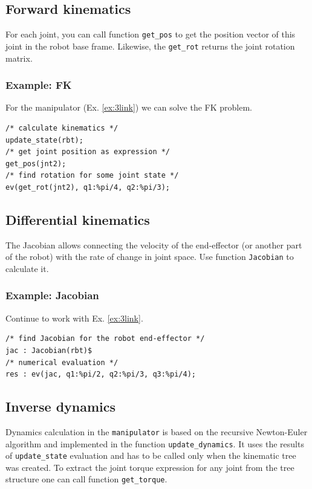 \documentclass{article}
\begin{document}
\subsection{Forward kinematics}

For each joint, you can call function \texttt{get\_pos} to get the position vector of this joint in the robot base frame. Likewise, the \texttt{get\_rot} returns the joint rotation matrix. 

\subsubsection{Example: FK}

For the manipulator (Ex. \ref{ex:3link}) we can solve the FK problem. 

\begin{verbatim}
/* calculate kinematics */
update_state(rbt); 
/* get joint position as expression */
get_pos(jnt2); 
/* find rotation for some joint state */
ev(get_rot(jnt2), q1:%pi/4, q2:%pi/3);
\end{verbatim}

\subsection{Differential kinematics}

The Jacobian allows connecting the velocity of the end-effector (or another part of the robot) with the rate of change in joint space. Use function \texttt{Jacobian} to calculate it.  

\subsubsection{Example: Jacobian} 

Continue to work with Ex. \ref{ex:3link}.
\begin{verbatim}
/* find Jacobian for the robot end-effector */
jac : Jacobian(rbt)$
/* numerical evaluation */
res : ev(jac, q1:%pi/2, q2:%pi/3, q3:%pi/4);
\end{verbatim}

\subsection{Inverse dynamics}
\label{sec:dyn}

Dynamics calculation in the \texttt{manipulator} is based on the recursive Newton-Euler algorithm and implemented in the function \texttt{update\_dynamics}. It uses the results of \texttt{update\_state} evaluation and has to be called only when the kinematic tree was created. To extract the joint torque expression for any joint from the tree structure one can call function \texttt{get\_torque}.
\end{document}

